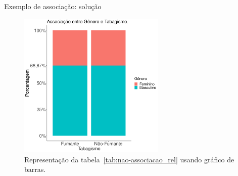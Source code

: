 \documentclass[9pt]{beamer}
\begin{document}
\begin{frame}{Exemplo de associação: solução}

\begin{figure}[htbp]
	\centering
	\includegraphics[width = 7cm]{figures/nao_associacao.png}
	\caption{Representação da tabela~\ref{tab:nao-associacao_rel} usando gráfico de barras.}
	\label{tab:graph-nao-associacao}
\end{figure}

\end{frame}
\end{document}
